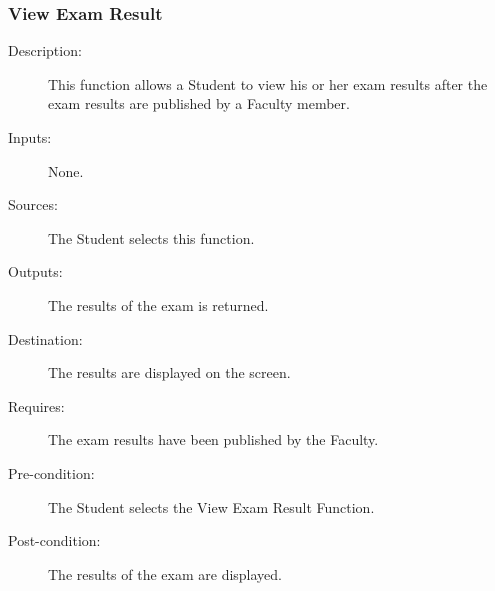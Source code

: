 \subsubsection{\large View Exam Result} 
\begin{boxed} %
\begin{description}
\item[Description:]
   This function allows a Student to view his or her exam results after the exam
   results are published by a Faculty member.
\item[Inputs:]
   None.
\item[Sources:]
   The Student selects this function.
\item[Outputs:]
   The results of the exam is returned.
\item[Destination:]
   The results are displayed on the screen.
\item[Requires:]
   The exam results have been published by the Faculty.
\item[Pre-condition:]
   The Student selects the View Exam Result Function.
\item[Post-condition:]
   The results of the exam are displayed.
\end{description}
\end{boxed} %
